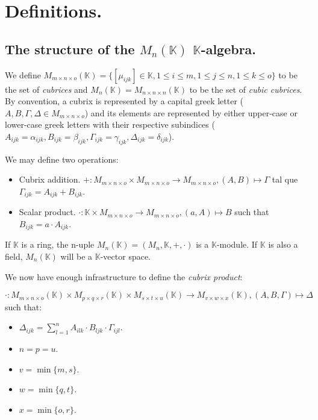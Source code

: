 \section{Definitions.} \label{defs}

\subsection{The structure of the $M_n (\mathbb{K})$ $\mathbb{K}$-algebra.} \label{defs-structure}

We define $M_{m\times n\times o} (\mathbb{K}) = \{ [\mu_{ijk}] \in \mathbb{K}, 1 \le i \le m, 1 \le j \le n, 1 \le k \le o\}$ to be the set of \textit{cubrices} and $M_n (\mathbb{K}) = M_{n\times n\times n} (\mathbb{K})$ to be the set of \textit{cubic cubrices}. By convention, a cubrix is represented by a capital greek letter ($A, B, \Gamma, \Delta \in M_{m\times n\times o}$) and its elements are represented by either upper-case or lower-case greek letters with their respective subindices ($A_{ijk} = \alpha_{ijk}, B_{ijk} = \beta_{ijk}, \Gamma_{ijk} = \gamma_{ijk}, \Delta_{ijk} = \delta_{ijk}$).

We may define two operations:

\begin{itemize}
	\item Cubrix addition. $+: M_{m\times n\times o} \times M_{m\times n\times o} \rightarrow M_{m\times n\times o}, (A, B) \mapsto \Gamma$ tal que $\Gamma_{ijk} = A_{ijk} + B_{ijk}$.
	\item Scalar product. $\cdot: \mathbb{K} \times M_{m\times n\times o} \rightarrow M_{m\times n\times o}, (a, A) \mapsto B$ such that $B_{ijk} = a \cdot A_{ijk}$.
\end{itemize}

If $\mathbb{K}$ is a ring, the n-uple $M_n (\mathbb{K}) = (M_n, \mathbb{K}, +, \cdot)$ is a $\mathbb{K}$-module. If $\mathbb{K}$ is also a field, $M_n (\mathbb{K})$ will be a $\mathbb{K}$-vector space.

\newpage

We now have enough infrastructure to define the \textit{cubrix product}:

$$\cdot: M_{m\times n\times o} (\mathbb{K}) \times M_{p\times q\times r} (\mathbb{K}) \times M_{s\times t\times u} (\mathbb{K}) \rightarrow M_{v\times w\times x} (\mathbb{K}), (A, B, \Gamma) \mapsto \Delta$$ such that:

\begin{itemize}
	\item $\Delta_{ijk} = \sum\limits_{l=1}^{n} A_{ilk} \cdot B_{ljk} \cdot \Gamma_{ijl}$.
	\item $n = p = u$.
	\item $v = \min\{m, s\}$.
	\item $w = \min\{q, t\}$.
	\item $x = \min\{o, r\}$.
\end{itemize}

